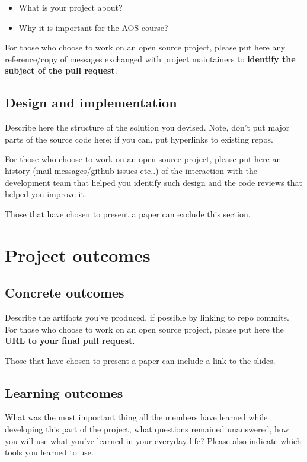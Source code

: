 \documentclass[10pt,a4]{article}
\begin{document}
\begin{itemize}
\item What is your project about?
\item Why it is important for the AOS course?
\end{itemize}

For those who choose to work on an open source project, please put here any
reference/copy of messages exchanged with project maintainers to \textbf{identify the subject
of the pull request}.

\subsection{Design and implementation}
Describe here the structure of the solution you devised. Note, don't put major
parts of the source code here; if you can, put hyperlinks to existing repos.

For those who choose to work on an open source project, please put here an
history (mail messages/github issues etc..) of the interaction with the
development team that helped you identify such design and the code reviews that
helped you improve it.

Those that have chosen to present a paper can exclude this section. 

\section{Project outcomes}

\subsection{Concrete outcomes}
Describe the artifacts you've produced, if possible by linking to repo commits.
For those who choose to work on an open source project, please put here the 
\textbf{URL to your final pull request}.

Those that have chosen to present a paper can include a link to the slides.

\subsection{Learning outcomes}

What was the most important thing all the members have learned while
developing this part of the project, what questions remained unanswered,
how you will use what you've learned in your everyday life?
Please also indicate which tools you learned to use.
\end{document}
